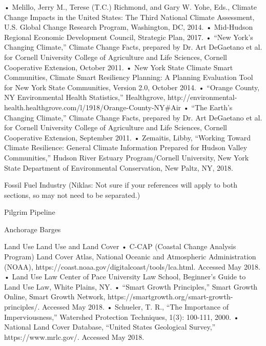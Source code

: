     • Melillo, Jerry M., Terese (T.C.) Richmond, and Gary W. Yohe, Eds., Climate Change Impacts in the United States:  The Third National Climate Assessment, U.S. Global Change Research Program, Washington, DC, 2014.
    • Mid-Hudson Regional Economic Development Council, Strategic Plan, 2017.
    • “New York’s Changing Climate,” Climate Change Facts, prepared by Dr. Art DeGaetano et al. for Cornell University College of Agriculture and Life Sciences, Cornell Cooperative Extension, October 2011.
    • New York State Climate Smart Communities, Climate Smart Resiliency Planning: A Planning Evaluation Tool for New York State Communities, Version 2.0, October 2014.
    • “Orange County, NY Environmental Health Statistics,” Healthgrove, http://environmental-health.healthgrove.com/l/1918/Orange-County-NY#Air%
    • “The Earth’s Changing Climate,” Climate Change Facts, prepared by Dr. Art DeGaetano et al. for Cornell University College of Agriculture and Life Sciences, Cornell Cooperative Extension, September 2011.
    • Zemaitis, Libby, “Working Toward Climate Resilience: General Climate Information Prepared for Hudson Valley Communities,” Hudson River Estuary Program/Cornell University, New York State Department of Environmental Conservation, New Paltz, NY, 2018.

Fossil Fuel Industry
(Niklas: Not sure if your references will apply to both sections, so may not need to be separated.)

Pilgrim Pipeline

Anchorage Barges

Land Use
Land Use and Land Cover
    • C-CAP (Coastal Change Analysis Program) Land Cover Atlas, National Oceanic and Atmospheric Administration (NOAA), https://coast.noaa.gov/digitalcoast/tools/lca.html. Accessed May 2018.
    • Land Use Law Center of Pace University Law School, Beginner’s Guide to Land Use Law, White Plains, NY.
    • “Smart Growth Principles,” Smart Growth Online, Smart Growth Network, https://smartgrowth.org/smart-growth-principles/. Accessed May 2018.
    • Schueler, T. R., “The Importance of Imperviousness,” Watershed Protection Techniques, 1(3): 100-111, 2000.
    • National Land Cover Database, “United States Geological Survey,” https://www.mrlc.gov/. Accessed May 2018.

